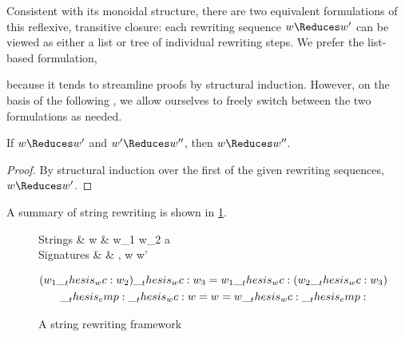 Consistent with its monoidal structure, there are two equivalent formulations of this reflexive, transitive closure: each rewriting sequence $w \Reduces w'$ can be viewed as either a list or tree of individual rewriting steps.
We prefer the list-based formulation,
because it tends to streamline proofs by structural induction.
However, on the basis of the following , we allow ourselves to freely switch between the two formulations as needed.
\begin{lemma}\label{lem:string-rewriting:trace-transitivity}
  If $w \Reduces w'$ and $w' \Reduces w''$, then $w \Reduces w''$.
\end{lemma}
\begin{proof}
  By structural induction over the first of the given rewriting sequences, $w \Reduces w'$.
\end{proof}


A summary of string rewriting is shown in \cref{fig:string-rewriting:summary}.
\begin{figure}[tbp]
  \vspace*{\dimexpr-\abovedisplayskip-\abovecaptionskip\relax}
  \begin{syntax*}
    Strings &
      w & w_1 \wc w_2 \mid \emp \mid a
    \\
    Signatures &
      \srsig & \srsige \mid \srsig, w \reduces w'
  \end{syntax*}
  \begin{gather*}
    (w_1 \wc w_2) \wc w_3 = w_1 \wc (w_2 \wc w_3) \\
    \emp \wc w = w = w \wc \emp
  \end{gather*}
  \caption{A string rewriting framework}\label{fig:string-rewriting:summary}
\end{figure}

